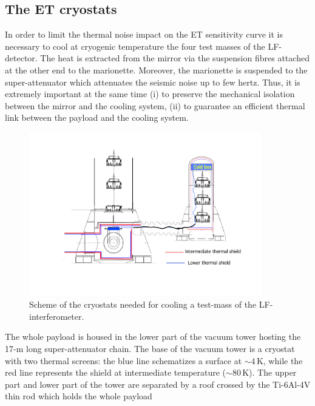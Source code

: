 \subsection{The ET cryostats}
\label{subsec:cryo}
In order to limit the thermal noise impact on the ET sensitivity curve it is necessary to cool at cryogenic temperature the four test masses of the LF-detector. The heat is extracted from the mirror via the suspension fibres attached at the other end to the marionette. Moreover, the marionette is suspended to the super-attenuator which attenuates the seismic noise up to few hertz. Thus, it is extremely important at the same time (i) to preserve the mechanical isolation between the mirror and the cooling system, (ii) to guarantee an efficient thermal link between the payload and the cooling system. 


\begin{figure}[h!]
	\centering
		\includegraphics[width=0.9\textwidth]{./Intro/Intro_Figures/ET_main-cryostat.pdf}
	\caption{Scheme of the cryostats needed for cooling a test-mass of the LF-interferometer.}
\label{fig:cryo_infrastructure_figure/ET_main-cryostat}
\end{figure}

The whole payload is housed in the lower part of the vacuum tower hosting the 17-m long super-attenuator chain. The base of the vacuum tower is a cryostat with two thermal screens: the blue line schematizes a surface at $\sim4$\,K, while the red line represents the shield at intermediate temperature ($\sim 80$\,K). The upper part and lower part of the tower are separated by a roof crossed by the Ti-6Al-4V thin rod which holds the whole payload

